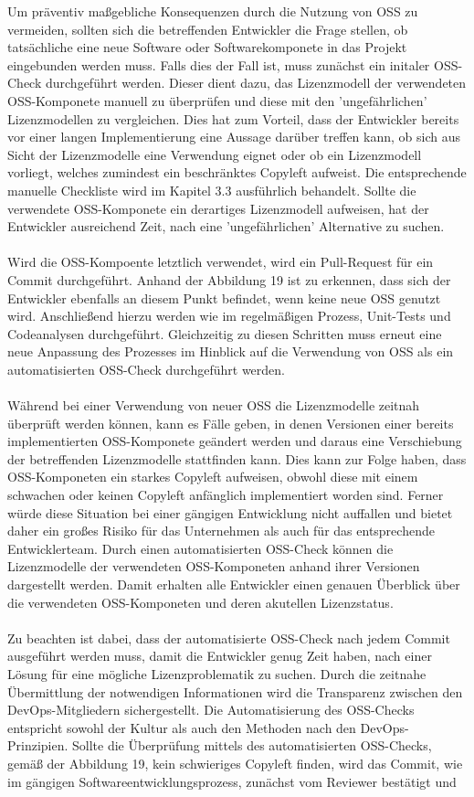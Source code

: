 Um präventiv maßgebliche Konsequenzen durch die Nutzung von OSS zu vermeiden, sollten sich die betreffenden Entwickler die Frage stellen, ob tatsächliche eine neue Software oder Softwarekomponete in das Projekt eingebunden werden muss. Falls dies der Fall ist, muss zunächst ein initaler OSS-Check durchgeführt werden. Dieser dient dazu, das Lizenzmodell der verwendeten OSS-Komponete manuell zu überprüfen und diese mit den 'ungefährlichen' Lizenzmodellen zu vergleichen. Dies hat zum Vorteil, dass der Entwickler bereits vor einer langen Implementierung eine Aussage darüber treffen kann, ob sich aus Sicht der Lizenzmodelle eine Verwendung eignet oder ob ein Lizenzmodell vorliegt, welches zumindest ein beschränktes Copyleft aufweist. Die entsprechende manuelle Checkliste wird im Kapitel 3.3 ausführlich behandelt. Sollte die verwendete OSS-Komponete ein derartiges Lizenzmodell aufweisen, hat der Entwickler ausreichend Zeit, nach eine 'ungefährlichen' Alternative zu suchen.\\\\ Wird die OSS-Kompoente letztlich verwendet, wird ein Pull-Request für ein Commit durchgeführt. Anhand der Abbildung 19 ist zu erkennen, dass sich der Entwickler ebenfalls an diesem Punkt befindet, wenn keine neue OSS genutzt wird. Anschließend hierzu werden wie im regelmäßigen Prozess, Unit-Tests und Codeanalysen durchgeführt. Gleichzeitig zu diesen Schritten muss erneut eine neue Anpassung des Prozesses im Hinblick auf die Verwendung von OSS als ein automatisierten OSS-Check durchgeführt werden.\\\\ Während bei einer Verwendung von neuer OSS die Lizenzmodelle zeitnah überprüft werden können, kann es Fälle geben, in denen Versionen einer bereits implementierten OSS-Komponete geändert werden und daraus eine Verschiebung der betreffenden Lizenzmodelle stattfinden kann. Dies kann zur Folge haben, dass OSS-Komponeten ein starkes Copyleft aufweisen, obwohl diese mit einem schwachen oder keinen Copyleft anfänglich implementiert worden sind. Ferner würde diese Situation bei einer gängigen Entwicklung nicht auffallen und bietet daher ein großes Risiko für das Unternehmen als auch für das entsprechende Entwicklerteam. Durch einen automatisierten OSS-Check können die Lizenzmodelle der verwendeten OSS-Komponeten anhand ihrer Versionen dargestellt werden. Damit erhalten alle Entwickler einen genauen Überblick über die verwendeten OSS-Komponeten und deren akutellen Lizenzstatus.\\\\ Zu beachten ist dabei, dass der automatisierte OSS-Check nach jedem Commit ausgeführt werden muss, damit die Entwickler genug Zeit haben, nach einer Lösung für eine mögliche Lizenzproblematik zu suchen. Durch die zeitnahe Übermittlung der notwendigen Informationen wird die Transparenz zwischen den DevOps-Mitgliedern sichergestellt. Die Automatisierung des OSS-Checks entspricht sowohl der Kultur als auch den Methoden nach den DevOps-Prinzipien. Sollte die Überprüfung mittels des automatisierten OSS-Checks, gemäß der Abbildung 19, kein schwieriges Copyleft finden, wird das Commit, wie im gängigen Softwareentwicklungsprozess, zunächst vom Reviewer bestätigt und 